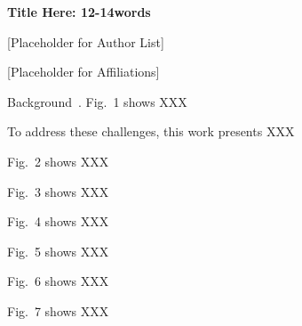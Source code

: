 \documentclass[12pt,letterpaper]{article} %
\begin{document}
\begin{comment}
times ×:	{\char"D7}
degree °:	{\char"B0}
tilda ~:	{\char"7E}

alpha ⍺:	{\char"3B1}
beta β:		{\char"3B2}
gamma γ:	{\char"3B3}
theta θ:	{\char"3B8}
omega ⍵:	{\char"3C9}

degree celsius ℃:  {\char"B0}C
degree fahrenheit: {\char"B0}F
Ohm Ω: {\char"3A9}
Area mm2: mm\textsuperscript{2}

再找不到就去这里找！
https://unicodelookup.com
\end{comment}

\textbf{Title Here: 12-14words}

[Placeholder for Author List]

[Placeholder for Affiliations]

Background~\cite{by22}. Fig.~1 shows XXX

To address these challenges, this work presents XXX

Fig.~2 shows XXX

Fig.~3 shows XXX

Fig.~4 shows XXX

Fig.~5 shows XXX

Fig.~6 shows XXX

Fig.~7 shows XXX


\clearpage




\begin{comment}

# Authors:
Bonan Yan , Peking University, bonanyan@pku.edu.cn

# Abstract (≤500 characters, including space/symbols)
blabla

# 1-Sentence Highlighter
This work presents the first XXX, achieving 1000TOPS/W.


\end{comment}
\end{document}

